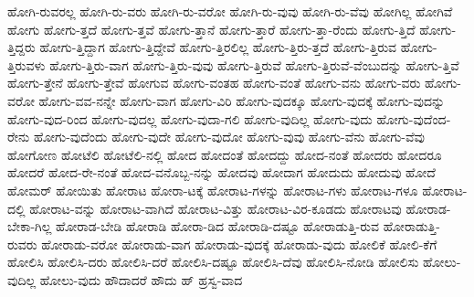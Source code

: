{ಹೋಗಿ-ರುವರಲ್ಲ
ಹೋಗಿ-ರು-ವರು
ಹೋಗಿ-ರು-ವರೋ
ಹೋಗಿ-ರು-ವುವು
ಹೋಗಿ-ರು-ವೆವು
ಹೋಗಿಲ್ಲ
ಹೋಗಿವೆ
ಹೋಗು
ಹೋಗು-ತ್ತದೆ
ಹೋಗು-ತ್ತವೆ
ಹೋಗು-ತ್ತಾನೆ
ಹೋಗು-ತ್ತಾರೆ
ಹೋಗು-ತ್ತಾ-ರೆಂದು
ಹೋಗು-ತ್ತಿದೆ
ಹೋಗು-ತ್ತಿದ್ದರು
ಹೋಗು-ತ್ತಿದ್ದಾಗ
ಹೋಗು-ತ್ತಿದ್ದೇವೆ
ಹೋಗು-ತ್ತಿರಲಿಲ್ಲ
ಹೋಗು-ತ್ತಿರು-ತ್ತದೆ
ಹೋಗು-ತ್ತಿರುವ
ಹೋಗು-ತ್ತಿರುವಳು
ಹೋಗು-ತ್ತಿರು-ವಾಗ
ಹೋಗು-ತ್ತಿರು-ವುವು
ಹೋಗು-ತ್ತಿರುವೆ
ಹೋಗು-ತ್ತಿರುವೆ-ವೆಂಬುದನ್ನು
ಹೋಗು-ತ್ತಿವೆ
ಹೋಗು-ತ್ತೇನೆ
ಹೋಗು-ತ್ತೇವೆ
ಹೋಗುವ
ಹೋಗು-ವಂತಹ
ಹೋಗು-ವಂತೆ
ಹೋಗು-ವನು
ಹೋಗು-ವರು
ಹೋಗು-ವರೋ
ಹೋಗು-ವವ-ನನ್ನೇ
ಹೋಗು-ವಾಗ
ಹೋಗು-ವಿರಿ
ಹೋಗು-ವುದಕ್ಕೂ
ಹೋಗು-ವುದಕ್ಕೆ
ಹೋಗು-ವುದನ್ನು
ಹೋಗು-ವುದ-ರಿಂದ
ಹೋಗು-ವುದಲ್ಲ
ಹೋಗು-ವುದಾ-ಗಲಿ
ಹೋಗು-ವುದಿಲ್ಲ
ಹೋಗು-ವುದು
ಹೋಗು-ವುದೆಂದ-ರೇನು
ಹೋಗು-ವುದೆಂದು
ಹೋಗು-ವುದೇ
ಹೋಗು-ವುದೋ
ಹೋಗು-ವುವು
ಹೋಗು-ವೆನು
ಹೋಗು-ವೆವು
ಹೋಗೋಣ
ಹೋಟೆಲಿ
ಹೋಟೆಲಿ-ನಲ್ಲಿ
ಹೋದ
ಹೋದಂತೆ
ಹೋದದ್ದು
ಹೋದ-ನಂತೆ
ಹೋದರು
ಹೋದರೂ
ಹೋದರೆ
ಹೋದ-ರೇ-ನಂತೆ
ಹೋದ-ವನೊಬ್ಬ-ನನ್ನು
ಹೋದವು
ಹೋದಾಗ
ಹೋದುದು
ಹೋದುವು
ಹೋದೆ
ಹೋಮರ್
ಹೋಯಿತು
ಹೋರಾಟ
ಹೋರಾ-ಟಕ್ಕೆ
ಹೋರಾಟ-ಗಳನ್ನು
ಹೋರಾಟ-ಗಳು
ಹೋರಾಟ-ಗಳೂ
ಹೋರಾಟ-ದಲ್ಲಿ
ಹೋರಾಟ-ವನ್ನು
ಹೋರಾಟ-ವಾಗಿದೆ
ಹೋರಾಟ-ವಿತ್ತು
ಹೋರಾಟ-ವಿರ-ಕೂಡದು
ಹೋರಾಟವು
ಹೋರಾಡ-ಬೇಕಾ-ಗಿಲ್ಲ
ಹೋರಾಡ-ಬೇಡಿ
ಹೋರಾಡಿ
ಹೋರಾ-ಡಿದ
ಹೋರಾಡಿ-ದಷ್ಟೂ
ಹೋರಾಡುತ್ತಿ-ರುವ
ಹೋರಾಡುತ್ತಿ-ರುವರು
ಹೋರಾಡು-ವರೋ
ಹೋರಾಡು-ವಾಗ
ಹೋರಾಡು-ವುದಕ್ಕೆ
ಹೋರಾಡು-ವುದು
ಹೋಲಿಕೆ
ಹೋಲಿ-ಕೆಗೆ
ಹೋಲಿಸಿ
ಹೋಲಿಸಿ-ದರು
ಹೋಲಿಸಿ-ದರೆ
ಹೋಲಿಸಿ-ದಷ್ಟೂ
ಹೋಲಿಸಿ-ದೆವು
ಹೋಲಿಸಿ-ನೋಡಿ
ಹೋಲಿಸು
ಹೋಲು-ವುದಿಲ್ಲ
ಹೋಲು-ವುದು
ಹೌದಾದರೆ
ಹೌದು
ಹ್
ಹ್ರಸ್ವ-ವಾದ
}
